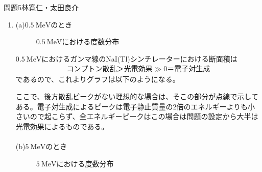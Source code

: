 \documentclass[fleqn]{jbook}
\begin{document}
\begin{answer}{問題5}{林寛仁・太田良介}
\begin{enumerate}
\item 

(a)$0.5 \ \mathrm{MeV}$のとき\\

\begin{figure}[h]
		\begin{center}
		\caption{$0.5 \ \mathrm{MeV}$における度数分布}
  		\end{center}
\end{figure}

$0.5 \ \mathrm{MeV}$におけるガンマ線のNaI(Tl)シンチレーターにおける断面積は
\begin{eqnarray}
	コンプトン散乱＞光電効果\gg 0＝電子対生成	\nonumber
\end{eqnarray}
であるので、これよりグラフは以下のようになる。

ここで、後方散乱ピークがない理想的な場合は、そこの部分が点線で示してある。電子対生成によるピークは電子静止質量の2倍のエネルギーよりも小さいので起こらず、全エネルギーピークはこの場合は問題の設定から大半は光電効果によるものである。\\
\\
(b)$5 \ \mathrm{MeV}$のとき\\

\begin{figure}[h]
		\begin{center}
		\caption{$5 \ \mathrm{MeV}$における度数分布}
  		\end{center}
\end{figure}


\end{enumerate}
\end{answer}
\end{document}
